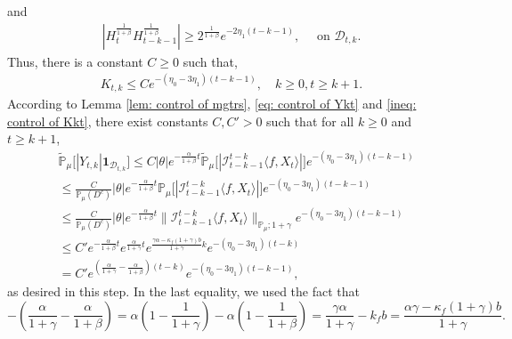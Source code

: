 \documentclass[12pt,a4paper]{amsart}
\theoremstyle{plain}
\theoremstyle{definition}
\numberwithin{equation}{section}
\begin{document}
    and
\begin{align*}
    |H_t^{\frac{1}{1+\beta}}H_{t-k-1}^{\frac{1}{1+\beta}}|
    \geq 2^{\frac{1}{1+\beta}} e^{-2\eta_1(t-k-1)},
    \quad \text{ on } \mathcal D_{t,k}.
\end{align*}
    Thus, there is a constant $C\geq 0$ such that,
\begin{equation}\begin{split}
\label{ineq: control of Kkt}
     K_{t,k}
     \leq C e^{-(\eta_0 - 3\eta_1)(t-k-1)},
     \quad k \geq 0, t\geq k+1.
\end{split}\end{equation}
   According to Lemma \ref{lem: control of mgtrs}, \eqref{eq: control of Ykt} and  \eqref{ineq: control of Kkt},
    there exist constants $C,C'>0$ such that  for all $k\geq 0$ and $t\geq k+1$,
\begin{equation}\begin{split}
\label{eq: Y in D}
    &\mathbb{\tilde{P}}_{\mu}\big[|Y_{t,k}|\mathbf{1}_{\mathcal{D}_{t,k}}\big]
    \leq C|\theta|e^{-\frac{\alpha}{1+\beta}t}\mathbb{\tilde{P}}_{\mu}\big[|\mathcal{I}_{t-k-1}^{t-k}\langle f,X_t\rangle|\big]e^{-(\eta_0 - 3\eta_1)(t-k-1)}
    \\&\leq \frac{C}{\mathbb{P}_{\mu}(D^c)}|\theta|e^{-\frac{\alpha}{1+\beta}t}\mathbb{P}_{\mu}\big[|\mathcal{I}_{t-k-1}^{t-k}\langle f,X_t\rangle|\big]e^{-(\eta_0 - 3\eta_1)(t-k-1)}
    \\&\leq \frac{C}{\mathbb{P}_{\mu}(D^c)}|\theta|e^{-\frac{\alpha}{1+\beta}t}\|\mathcal{I}_{t-k-1}^{t-k}\langle f,X_t\rangle\|_{\mathbb P_\mu; 1+\gamma} e^{-(\eta_0 - 3\eta_1)(t-k - 1)}
    \\&\leq C' e^{-\frac{\alpha}{1+\beta}t}e^{\frac{\alpha}{1+\gamma}t}e^{\frac{\gamma \alpha-\kappa_f(1+\gamma)b}{1+\gamma}k}e^{-(\eta_0 - 3\eta_1)(t-k)}\\&= C' e^{(\frac{\alpha}{1+\gamma}-\frac{\alpha}{1+\beta})(t-k)}e^{-(\eta_0 - 3\eta_1)(t-k-1)},
\end{split}\end{equation}
    as desired in this step.
    In the last equality, we used the fact that
\[
    -(\frac{\alpha}{1+\gamma}-\frac{\alpha}{1+\beta})
    = \alpha(1-\frac{1}{1+\gamma}) - \alpha(1-\frac{1}{1+\beta})
    = \frac{\gamma \alpha}{1+\gamma} - k_f b
    =\frac{\alpha \gamma-\kappa_f(1+\gamma)b}{1+\gamma}.
\]
\end{document}
